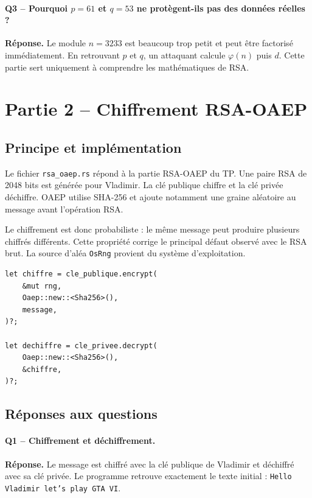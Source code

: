 \documentclass[11pt,a4paper]{article}
\newcommand{\fichier}[1]{\texttt{#1}}
\newcommand{\reponse}{\textbf{Réponse.} }
\begin{document}
\paragraph{Q3 -- Pourquoi $p=61$ et $q=53$ ne protègent-ils pas des données réelles ?}
\reponse Le module $n=3233$ est beaucoup trop petit et peut être factorisé
immédiatement. En retrouvant $p$ et $q$, un attaquant calcule $\varphi(n)$ puis $d$.
Cette partie sert uniquement à comprendre les mathématiques de RSA.

\section{Partie 2 -- Chiffrement RSA-OAEP}

\subsection{Principe et implémentation}

Le fichier \fichier{rsa\_oaep.rs} répond à la partie RSA-OAEP du TP. Une paire RSA
de 2048 bits est générée pour Vladimir. La clé publique chiffre et la clé privée
déchiffre. OAEP utilise SHA-256 et ajoute notamment une graine aléatoire au message
avant l'opération RSA.

Le chiffrement est donc probabiliste : le même message peut produire plusieurs
chiffrés différents. Cette propriété corrige le principal défaut observé avec le RSA
brut. La source d'aléa \texttt{OsRng} provient du système d'exploitation.

\begin{lstlisting}[caption={Opérations principales de la partie RSA-OAEP}]
let chiffre = cle_publique.encrypt(
    &mut rng,
    Oaep::new::<Sha256>(),
    message,
)?;

let dechiffre = cle_privee.decrypt(
    Oaep::new::<Sha256>(),
    &chiffre,
)?;
\end{lstlisting}

\subsection{Réponses aux questions}

\paragraph{Q1 -- Chiffrement et déchiffrement.}
\reponse Le message est chiffré avec la clé publique de Vladimir et déchiffré avec sa
clé privée. Le programme retrouve exactement le texte initial :
\texttt{Hello Vladimir let's play GTA VI}.
\end{document}
